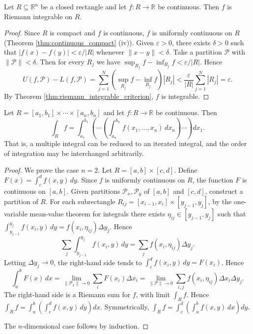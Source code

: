 \begin{theorem}\label{thm:continuous_integrable}
Let $R \subseteq \mathbb{R}^n$ be a closed rectangle and let $f: R \to \mathbb{R}$ be continuous. Then $f$ is Riemann integrable on $R$.
\end{theorem}

\begin{proof}
Since $R$ is compact and $f$ is continuous, $f$ is uniformly continuous on $R$ (Theorem \ref{thm:continuous_compact} (iv)). Given $\varepsilon > 0$, there exists $\delta > 0$ such that $|f(x) - f(y)| < \varepsilon / |R|$ whenever $\|x - y\| < \delta$. Take a partition $\mathcal{P}$ with $\|\mathcal{P}\| < \delta$. Then for every $R_j$ we have $\sup_{R_j} f - \inf_{R_j} f < \varepsilon / |R|$. Hence
\[
U(f, \mathcal{P}) - L(f, \mathcal{P}) = \sum_{j=1}^{N} \left( \sup_{R_j} f - \inf_{R_j} f \right) |R_j| < \frac{\varepsilon}{|R|} \sum_{j=1}^{N} |R_j| = \varepsilon.
\]
By Theorem \ref{thm:riemann_integrable_criterion}, $f$ is integrable.
\end{proof}

\begin{theorem}\label{thm:fubini_ra}
Let $R = [a_1, b_1] \times \cdots \times [a_n, b_n]$ and let $f: R \to \mathbb{R}$ be continuous. Then
\[
\int_R f = \int_{a_1}^{b_1} \left( \cdots \left( \int_{a_n}^{b_n} f(x_1, \dots, x_n) \, dx_n \right) \cdots \right) dx_1.
\]
That is, a multiple integral can be reduced to an iterated integral, and the order of integration may be interchanged arbitrarily.
\end{theorem}

\begin{proof}
We prove the case $n = 2$. Let $R = [a, b] \times [c, d]$. Define $F(x) = \int_c^d f(x, y) \, dy$. Since $f$ is uniformly continuous on $R$, the function $F$ is continuous on $[a, b]$. Given partitions $\mathcal{P}_x, \mathcal{P}_y$ of $[a, b]$ and $[c, d]$, construct a partition of $R$. For each subrectangle $R_{ij} = [x_{i-1}, x_i] \times [y_{j-1}, y_j]$, by the one-variable mean-value theorem for integrals there exists $\eta_{ij} \in [y_{j-1}, y_j]$ such that $\int_{y_{j-1}}^{y_j} f(x_i, y) \, dy = f(x_i, \eta_{ij}) \Delta y_j$. Hence
\[
\sum_j \int_{y_{j-1}}^{y_j} f(x_i, y) \, dy = \sum_j f(x_i, \eta_{ij}) \Delta y_j.
\]
Letting $\Delta y_j \to 0$, the right-hand side tends to $\int_c^d f(x_i, y) \, dy = F(x_i)$. Hence
\[
\int_a^b F(x) \, dx = \lim_{\|\mathcal{P}_x\| \to 0} \sum_i F(x_i) \Delta x_i = \lim_{\|\mathcal{P}\| \to 0} \sum_{i,j} f(x_i, \eta_{ij}) \Delta x_i \Delta y_j.
\]
The right-hand side is a Riemann sum for $f$, with limit $\int_R f$. Hence $\int_R f = \int_a^b \left( \int_c^d f(x, y) \, dy \right) dx$. Symmetrically, $\int_R f = \int_c^d \left( \int_a^b f(x, y) \, dx \right) dy$.

The $n$-dimensional case follows by induction.
\end{proof}

